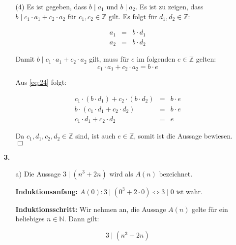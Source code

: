 \documentclass[a4paper,10pt]{scrartcl}
\begin{document}
\begin{enumerate}
\begin{enumerate}
            \item[(4)]
                Es ist gegeben, dass $b \mid a_1$ und $b \mid a_2$. Es ist zu zeigen, dass $b \mid c_1 \cdot a_1
                + c_2 \cdot a_2$ für $c_1, c_2 \in \mathbb{Z}$ gilt. Es folgt für $d_1, d_2 \in \mathbb{Z}$:

                \begin{equation}\label{eq:24}\begin{array}{rcl}
                    a_1 &=& b \cdot d_1\\
                    a_2 &=& b \cdot d_2
                \end{array}\end{equation}

                Damit $b \mid c_1 \cdot a_1 + c_2 \cdot a_2$ gilt, muss für $e$ im folgenden $e \in \mathbb{Z}$ gelten:
                $$c_1 \cdot a_1 + c_2 \cdot a_2 = b \cdot e$$

                Aus \eqref{eq:24} folgt:

                $$\begin{array}{rcl}
                    c_1 \cdot (b \cdot d_1) + c_2 \cdot (b \cdot d_2) &=& b \cdot e\\
                    b \cdot (c_1 \cdot d_1 + c_2 \cdot d_2) &=& b \cdot e\\
                    c_1 \cdot d_1 + c_2 \cdot d_2 &=& e
                \end{array}$$

                Da $c_1, d_1, c_2, d_2 \in \mathbb{Z}$ sind, ist auch $e \in \mathbb{Z}$, somit ist die Aussage bewiesen. $\Box$
        \end{enumerate}

    \item[\textbf{3.}]
        \begin{enumerate}
            \item[a)]
                Die Aussage $3 \mid (n^3 + 2n)$ wird als $A(n)$ bezeichnet.

                \textbf{Induktionsanfang:} $A(0): 3 \mid (0^3 + 2 \cdot 0) \Leftrightarrow 3 \mid 0$ ist wahr.

                \textbf{Induktionsschritt:} Wir nehmen an, die Aussage $A(n)$ gelte für ein beliebiges
                $n \in \mathbb{N}$. Dann gilt:

                \begin{equation}\label{eq:3aIA}\tag{IA}
                    3 \mid (n^3 + 2n)
                \end{equation}


\end{enumerate}
\end{enumerate}
\end{document}
